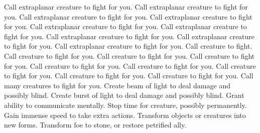     {Call extraplanar creature to fight for you.}
    {Call extraplanar creature to fight for you.}
    {Call extraplanar creature to fight for you.}
    {Call extraplanar creature to fight for you.}
    {Call extraplanar creature to fight for you.}
    {Call extraplanar creature to fight for you.}
    {Call extraplanar creature to fight for you.}
    {Call extraplanar creature to fight for you.}
    {Call extraplanar creature to fight for you.}
    {Call creature to fight.}
    {Call creature to fight for you.}
    {Call creature to fight for you.}
    {Call creature to fight for you.}
    {Call creature to fight for you.}
    {Call creature to fight for you.}
    {Call creature to fight for you.}
    {Call creature to fight for you.}
    {Call creature to fight for you.}
    {Call many creatures to fight for you.}
    {Create beam of light to deal damage and possibly blind.}
    {Create burst of light to deal damage and possibly blind.}
    {Grant ability to communicate mentally.}
    {Stop time for creature, possibly permanently.}
    {Gain immense speed to take extra actions.}
    {Transform objects or creatures into new forms.}
    {Transform foe to stone, or restore petrified ally.}
